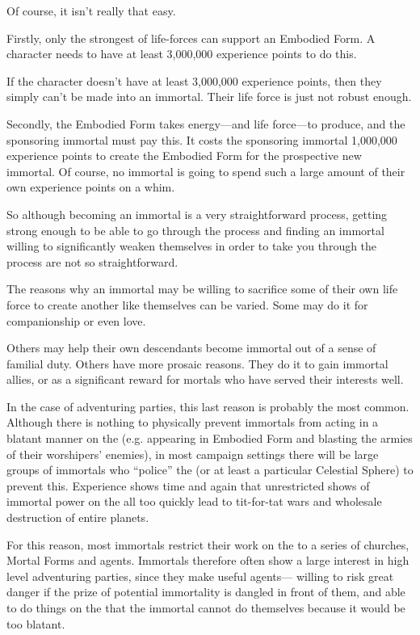 \begin{multicols*}{2}
Of course, it isn’t really that easy.

Firstly, only the strongest of life-forces can support an Embodied Form. A character needs to have at least 3,000,000 experience points to do this.

If the character doesn’t have at least 3,000,000 experience points, then they simply can’t be made into an immortal. Their life force is just not robust enough.

Secondly, the Embodied Form takes energy—and life force—to produce, and the sponsoring immortal must pay this. It costs the sponsoring immortal 1,000,000 experience points to create the Embodied Form for the prospective new immortal. Of course, no immortal is going to spend such a large amount of their own experience points on a whim.

So although becoming an immortal is a very straightforward process, getting strong enough to be able to go through the process and finding an immortal willing to significantly weaken themselves in order to take you through the process are not so straightforward.

The reasons why an immortal may be willing to sacrifice some of their own life force to create another like themselves can be varied. Some may do it for companionship or even love.

Others may help their own descendants become immortal out of a sense of familial duty. Others have more prosaic reasons. They do it to gain immortal allies, or as a significant reward for mortals who have served their interests well.

In the case of adventuring parties, this last reason is probably the most common. Although there is nothing to physically prevent immortals from acting in a blatant manner on the  (e.g. appearing in Embodied Form and blasting the armies of their worshipers’ enemies), in most campaign settings there will be large groups of immortals who “police” the  (or at least a particular Celestial Sphere) to prevent this. Experience shows time and again that unrestricted shows of immortal power on the  all too quickly lead to tit-for-tat wars and wholesale destruction of entire planets.

For this reason, most immortals restrict their work on the  to a series of churches, Mortal Forms and agents. Immortals therefore often show a large interest in high level adventuring parties, since they make useful agents— willing to risk great danger if the prize of potential immortality is dangled in front of them, and able to do things on the  that the immortal cannot do themselves because it would be too blatant. 


\end{multicols*}
